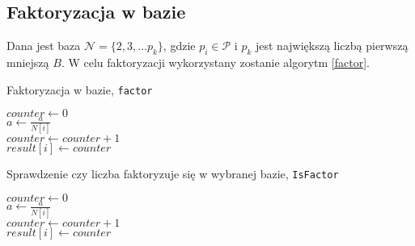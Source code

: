 \documentclass[]{article}
\begin{document}
	\subsection{Faktoryzacja w bazie}
		Dana jest baza \(\mathcal{N} = \{2, 3, \dots p_k\}\), gdzie \(p_i \in \mathcal{P}\) i \(p_k\) jest największą liczbą pierwszą mniejszą \(B\). 
		W celu faktoryzacji wykorzystany zostanie algorytm \ref{factor}.
		\newline
		\begin{algorithm}[H]
			\SetAlgoLined
			\caption{Faktoryzacja w bazie, \texttt{factor}}
			\label{factor}
			{
				\(counter \gets 0\) \\
				{
					\(a \gets \frac{a}{N[i]}\) \\
					\(counter \gets counter + 1\) \\
				}
				\(result[i] \gets counter\) \\
			}
		\end{algorithm}
	
		\begin{algorithm}[H]
			\SetAlgoLined
			\caption{Sprawdzenie czy liczba faktoryzuje się w wybranej bazie, \texttt{IsFactor}}
			\label{factor_alt}
			{
				\(counter \gets 0\) \\
				{
					\(a \gets \frac{a}{N[i]}\) \\
					\(counter \gets counter + 1\) \\
				}
				\(result[i] \gets counter\) \\
			}
			{
			}
			\Else
			{
			}
			
			
		\end{algorithm}
		
\end{document}
